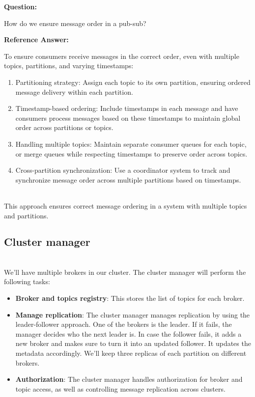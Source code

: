 \textbf{Question:}

How do we ensure message order in a pub-sub?

\textbf{Reference Answer:}

To ensure consumers receive messages in the correct order, even with multiple topics, partitions, and varying timestamps:

\begin{enumerate}
\def\labelenumi{\arabic{enumi}.}
\tightlist
\item
Partitioning strategy: Assign each topic to its own partition, ensuring ordered message delivery within each partition. 
\item
Timestamp-based ordering: Include timestamps in each message and have consumers process messages based on these timestamps to maintain global order across partitions or topics. 
\item
Handling multiple topics: Maintain separate consumer queues for each topic, or merge queues while respecting timestamps to preserve order across topics. 
\item
Cross-partition synchronization: Use a coordinator system to track and synchronize message order across multiple partitions based on timestamps.
\end{enumerate}

\\
This approach ensures correct message ordering in a system with multiple topics and partitions.

\subsection{Cluster manager}\label{gxXG3aFplD-aoTzLup5z7}
\\
We'll have multiple brokers in our cluster. The cluster manager will perform the following tasks:

\begin{itemize}
\item
\protect{}\label{aQdgy9eJDTzECY2v4u3Cz}
\textbf{Broker and topics registry}: This stores the list of topics for each broker.
\item
\protect{}\label{NcYzr2rR1pBcZasM5RQyB}
\textbf{Manage replication}: The cluster manager manages replication by using the leader-follower approach. One of the brokers is the leader. If it fails, the manager decides who the next leader is. In case the follower fails, it adds a new broker and makes sure to turn it into an updated follower. It updates the metadata accordingly. We'll keep three replicas of each partition on different brokers.
\item
\protect{}\label{FKGZRz-etQXNIZT35QW3c}
\textbf{Authorization}: The cluster manager handles authorization for broker and topic access, as well as controlling message replication across clusters.
\end{itemize}

